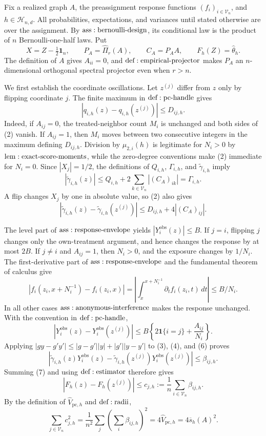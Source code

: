 Fix a realized graph \(A\), the preassignment response functions \((f_i)_{i\in\mathcal V_n}\), and \(h\in\mathcal H_{n,d}\).  All probabilities, expectations, and variances until stated otherwise are over the assignment.  By \({\rm ass:bernoulli\text{-}design}\), its conditional law is the product of \(n\) Bernoulli-one-half laws.  Put
\[
 X=Z-\tfrac12\mathbf1_n,\qquad
 P_A=\widehat\Pi_r(A),\qquad C_A=P_AA,
 \qquad F_h(Z)=\widehat\theta_h.
\tag{1}
\]
The definition of \(A\) gives \(A_{ii}=0\), and \({\rm def:empirical\text{-}projector}\) makes \(P_A\) an \(n\)-dimensional orthogonal spectral projector even when \(r>n\).

We first establish the coordinate oscillations.  Let \(z^{(j)}\) differ from \(z\) only by flipping coordinate \(j\).  The finite maximum in \({\rm def:pc\text{-}handle}\) gives
\[
 |q_{i,h}(z)-q_{i,h}(z^{(j)})|\leq D_{ij,h}.
\tag{2}
\]
Indeed, if \(A_{ij}=0\), the treated-neighbor count \(M_i\) is unchanged and both sides of (2) vanish.  If \(A_{ij}=1\), then \(M_i\) moves between two consecutive integers in the maximum defining \(D_{ij,h}\).  Division by \(\mu_{2,i}(h)\) is legitimate for \(N_i>0\) by \({\rm lem:exact\text{-}score\text{-}moments}\), while the zero-degree conventions make (2) immediate for \(N_i=0\).  Since \(|X_j|=1/2\), the definitions of \(Q_{i,h}\), \(\Gamma_{i,h}\), and \(\widetilde\gamma_{i,h}\) imply
\[
 |\widetilde\gamma_{i,h}(z)|
 \leq Q_{i,h}+2\sum_{k\in\mathcal V_n}|(C_A)_{ik}|
 =\Gamma_{i,h}.
\tag{3}
\]
A flip changes \(X_j\) by one in absolute value, so (2) also gives
\[
 |\widetilde\gamma_{i,h}(z)-\widetilde\gamma_{i,h}(z^{(j)})|
 \leq D_{ij,h}+4|(C_A)_{ij}|.
\tag{4}
\]

The level part of \({\rm ass:response\text{-}envelope}\) yields \(|Y_i^{\mathrm{obs}}(z)|\leq B\).  If \(j=i\), flipping \(j\) changes only the own-treatment argument, and hence changes the response by at most \(2B\).  If \(j\ne i\) and \(A_{ij}=1\), then \(N_i>0\), and the exposure changes by \(1/N_i\).  The first-derivative part of \({\rm ass:response\text{-}envelope}\) and the fundamental theorem of calculus give
\[
 |f_i(z_i,x+N_i^{-1})-f_i(z_i,x)|
 =\left|\int_x^{x+N_i^{-1}}\partial_t f_i(z_i,t)\,dt\right|
 \leq B/N_i.
\tag{5}
\]
In all other cases \({\rm ass:anonymous\text{-}interference}\) makes the response unchanged.  With the convention in \({\rm def:pc\text{-}handle}\),
\[
 |Y_i^{\mathrm{obs}}(z)-Y_i^{\mathrm{obs}}(z^{(j)})|
 \leq B\left\{2\mathbf1\{i=j\}+\frac{A_{ij}}{N_i}\right\}.
\tag{6}
\]
Applying \(|gy-g'y'|\leq|g-g'||y|+|g'||y-y'|\) to (3), (4), and (6) proves
\[
 |\widetilde\gamma_{i,h}(z)Y_i^{\mathrm{obs}}(z)
 -\widetilde\gamma_{i,h}(z^{(j)})Y_i^{\mathrm{obs}}(z^{(j)})|
 \leq\beta_{ij,h}.
\tag{7}
\]
Summing (7) and using \({\rm def:estimator}\) therefore gives
\[
 |F_h(z)-F_h(z^{(j)})|
 \leq c_{j,h}:=\frac1n\sum_{i\in\mathcal V_n}\beta_{ij,h}.
\tag{8}
\]
By the definition of \(\widehat V_{\mathrm{pc},h}\) and \({\rm def:radii}\),
\[
 \sum_{j\in\mathcal V_n}c_{j,h}^2
 =\frac1{n^2}\sum_j\left(\sum_i\beta_{ij,h}\right)^2
 =4\widehat V_{\mathrm{pc},h}=4\overline s_h(A)^2.
\tag{9}
\]

